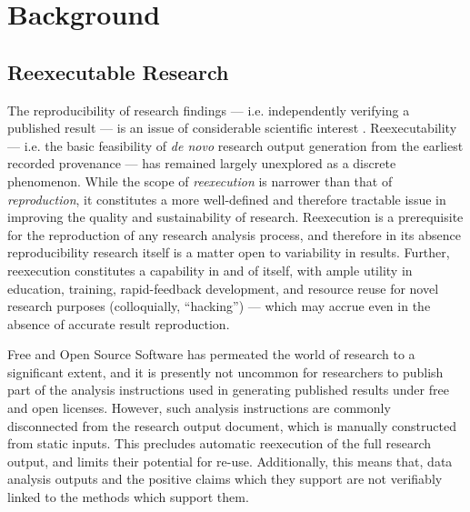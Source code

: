 \section{Background}

\subsection{Reexecutable Research}

The reproducibility of research findings — i.e. independently verifying a published result — is an issue of considerable scientific interest \cite{TODO}.
Reexecutability — i.e. the basic feasibility of \textit{de novo} research output generation from the earliest recorded provenance — has remained largely unexplored as a discrete phenomenon.
While the scope of \textit{reexecution} is narrower than that of \textit{reproduction}, it constitutes a more well-defined and therefore tractable issue in improving the quality and sustainability of research.
Reexecution is a prerequisite for the reproduction of any research analysis process, and therefore in its absence reproducibility research itself is a matter open to variability in results.
Further, reexecution constitutes a capability in and of itself, with ample utility in education, training, rapid-feedback development, and resource reuse for novel research purposes (colloquially, “hacking”) — which may accrue even in the absence of accurate result reproduction.

Free and Open Source Software \cite{foss} has permeated the world of research to a significant extent, and it is presently not uncommon for researchers to publish part of the analysis instructions used in generating published results \cite{TODO} under free and open licenses.
However, such analysis instructions are commonly disconnected from the research output document, which is manually constructed from static inputs.
This precludes automatic reexecution of the full research output, and limits their potential for re-use.
Additionally, this means that, data analysis outputs and the positive claims which they support are not verifiably linked to the methods which support them.

